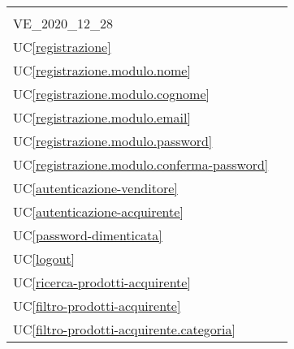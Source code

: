 \begin{longtable}{C{6cm} C{6cm}}
    \newline
    
    \\
	
	VE\_2020\_12\_28 &  \newline {}  \\

	UC\ref{registrazione} &  \\

	UC\ref{registrazione.modulo.nome} &  \\

    UC\ref{registrazione.modulo.cognome} &  \\

	UC\ref{registrazione.modulo.email} &  \\

    UC\ref{registrazione.modulo.password} &  \\

	UC\ref{registrazione.modulo.conferma-password} &  \\

    UC\ref{autenticazione-venditore} &  \\

	UC\ref{autenticazione-acquirente} &  \\

    UC\ref{password-dimenticata} &  \\

	UC\ref{logout} &  \\

    UC\ref{ricerca-prodotti-acquirente} &  \\

	UC\ref{filtro-prodotti-acquirente} &  \\

    UC\ref{filtro-prodotti-acquirente.categoria} &  \\


\end{longtable}
